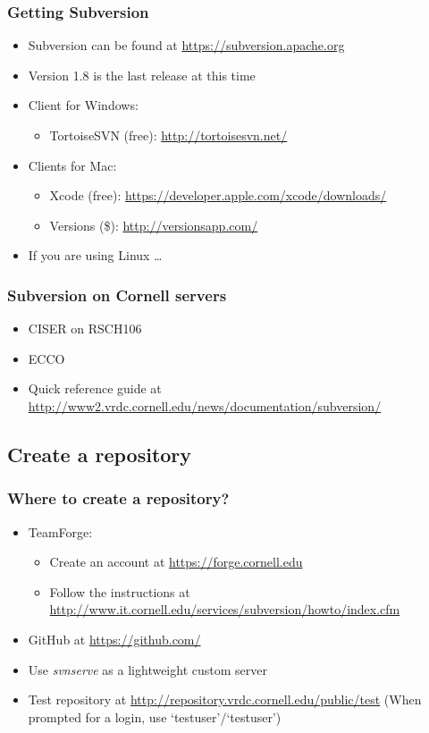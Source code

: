 \documentclass{beamer}
\begin{document}
\frame
{
  \frametitle{Getting Subversion}
  
  \begin{itemize}
  \item<1-> Subversion can be found at \url{https://subversion.apache.org}
  \item<2-> Version 1.8 is the last release at this time
  \item<3-> Client for Windows:
  	\begin{itemize}
	\item<3-> TortoiseSVN (free): \url{http://tortoisesvn.net/}
	\end{itemize}
  \item<4-> Clients for Mac:
  	\begin{itemize}
	\item<4-> Xcode (free): \url{https://developer.apple.com/xcode/downloads/}
	\item<4-> Versions (\$): \url{http://versionsapp.com/}
	\end{itemize}
  \item<5-> If you are using Linux \dots 
  		 \uncover<6->{use the terminal!}
  \end{itemize}
}

\frame
{
  \frametitle{Subversion on Cornell servers}
  
  \begin{itemize}
  \item<1-> CISER on RSCH106
  \item<2-> ECCO
  \item<3-> Quick reference guide at \url{http://www2.vrdc.cornell.edu/news/documentation/subversion/}
  \end{itemize}

}

\subsection{Create a repository}

\frame
{
  \frametitle{Where to create a repository?}
  
  \begin{itemize}
  \item<1-> TeamForge:
  	\begin{itemize}
	\item<1-> Create an account at \url{https://forge.cornell.edu}
	\item<1-> Follow the instructions at \url{http://www.it.cornell.edu/services/subversion/howto/index.cfm}
	\end{itemize}
  \item<2-> GitHub at \url{https://github.com/}
  \item<3-> Use \textit{svnserve} as a lightweight custom server
  \item<4-> Test repository at \url{http://repository.vrdc.cornell.edu/public/test} (When prompted for a login, use `testuser'/`testuser')
  \end{itemize}

}
\end{document}
